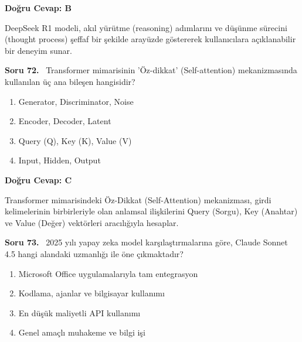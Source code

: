\documentclass[11pt,a4paper,openany]{book}
\begin{document}
\vspace{4pt}
\begin{tcolorbox}[title=Cevap ve Açıklama, colback=gray!3!white, colframe=primarycolor!90!black, arc=2mm, fonttitle=\bfseries\sffamily, top=6pt, bottom=6pt]
    \textbf{Doğru Cevap: B}

    \vspace{2pt}
    DeepSeek R1 modeli, akıl yürütme (reasoning) adımlarını ve düşünme sürecini (thought process) şeffaf bir şekilde arayüzde göstererek kullanıcılara açıklanabilir bir deneyim sunar.
\end{tcolorbox}
\vspace{10pt}
\needspace{5cm}
\vspace{8pt}
\noindent\textbf{\large\sffamily Soru 72.} \ Transformer mimarisinin 'Öz-dikkat' (Self-attention) mekanizmasında kullanılan üç ana bileşen hangisidir?

\begin{enumerate}[label=\Alph*), leftmargin=25pt, topsep=4pt, itemsep=2pt]
        \item Generator, Discriminator, Noise
        \item Encoder, Decoder, Latent
        \item Query (Q), Key (K), Value (V)
        \item Input, Hidden, Output
\end{enumerate}

\vspace{4pt}
\begin{tcolorbox}[title=Cevap ve Açıklama, colback=gray!3!white, colframe=primarycolor!90!black, arc=2mm, fonttitle=\bfseries\sffamily, top=6pt, bottom=6pt]
    \textbf{Doğru Cevap: C}

    \vspace{2pt}
    Transformer mimarisindeki Öz-Dikkat (Self-Attention) mekanizması, girdi kelimelerinin birbirleriyle olan anlamsal ilişkilerini Query (Sorgu), Key (Anahtar) ve Value (Değer) vektörleri aracılığıyla hesaplar.
\end{tcolorbox}
\vspace{10pt}
\needspace{5cm}
\vspace{8pt}
\noindent\textbf{\large\sffamily Soru 73.} \ 2025 yılı yapay zeka model karşılaştırmalarına göre, Claude Sonnet 4.5 hangi alandaki uzmanlığı ile öne çıkmaktadır?

\begin{enumerate}[label=\Alph*), leftmargin=25pt, topsep=4pt, itemsep=2pt]
        \item Microsoft Office uygulamalarıyla tam entegrasyon
        \item Kodlama, ajanlar ve bilgisayar kullanımı
        \item En düşük maliyetli API kullanımı
        \item Genel amaçlı muhakeme ve bilgi işi
\end{enumerate}
\end{document}

